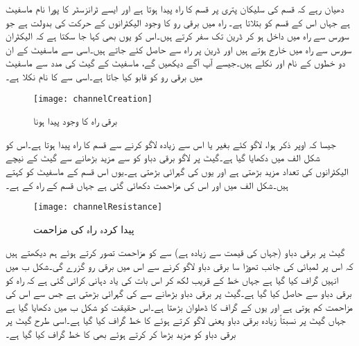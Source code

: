 دھیان رہے کہ  قسم کی سلیکان پتری پر  قسم کا راہ پیدا ہوتا ہے اور ایسے ٹرانزسٹر کا پورا نام    ماسفیٹ  ہے جہاں  اس  کے قسم کو بتلاتا ہے۔ راہ میں برقی رو کا وجود الیکٹرانوں کے حرکت کی بدولت ہے جو سورس سے راہ میں داخل ہو کر ڈرین تک سفر کرتے ہیں۔اس کو یوں بھی کہا جا سکتا ہے کہ الیکٹران سورس سے راہ میں خارج ہوتے ہیں اور ڈرین پر راہ سے حاصل کئے جاتے ہیں۔اسی سے ماسفیٹ کے ان دو خطوں کے نام  اور  نکلے ہیں۔جیسے آپ آگے دیکھیں گے، ماسفیٹ کے گیٹ کی مدد سے ماسفیٹ میں برقی رو کو قابو کیا جاتا ہے۔اسی سے  کا نام نکلا ہے۔
\begin{figure}
\centering
\texttt{[image: channelCreation]}
\caption{برقی راہ کا وجود پیدا ہونا}
\label{شکل_برقی_راہ_کا_وجود_پیدا_ہونا}
\end{figure}
جیسا کہ اوپر ذکر ہوا،  لاگو کئے بغیر  یا اس سے زیادہ  لاگو کرنے  سے  قسم کا راہ پیدا ہوتا ہے۔اس  کو شکل  الف میں دکھایا  گیا ہے۔گیٹ پر لاگو برقی دباو کو  سے مزید بڑھانے سے گیٹ کے نیچے الیکٹرانوں کی تعداد مزید بڑھتی ہے اور یوں  کی گہرائی  بڑھتی ہے۔یوں اس قسم کے ماسفیٹ کو  
  کہتے ہیں۔شکل  الف میں  اور اس کی مزاحمت   دکھائی گئی ہے جہاں  قسم کے راہ کے   ہے۔
\begin{figure}
\centering
\texttt{[image: channelResistance]}
\caption{پیدا کردہ راہ کی مزاحمت}
\label{شکل_پیدا_کردہ_راہ_کی_مزاحمت}
\end{figure}
گیٹ پر   برقی دباو (جہاں  کی قیمت   سے زیادہ ہے) سے  کو مزاحمت  تصور کرتے ہوئے ہم دیکھتے ہیں کہ اس پر لمبائی کی جانب تھوڑا سا برقی دباو  لاگو کرنے سے اس میں برقی رو  گزرے گی۔شکل  ب میں انہیں گراف کیا گیا ہے جہاں خط کے قریب لکھ کر اس بات کی یاد دہانی کرائی گئی ہے کہ راہ کو   برقی دباو سے حاصل کیا گیا ہے۔گیٹ پر برقی دباو  بڑھانے سے  کی گہرائی   بڑھتی ہے جس سے اس کی مزاحمت   کم  ہوتی ہے اور یوں   کے گراف کا ڈھلوان بڑھتا ہے۔اس حقیقت کو شکل  ب میں دکھایا گیا ہے جہاں گیٹ پر نسبتاً زیادہ برقی دباو یعنی  لاگو کرتے ہوئے  کا خط گراف  کیا گیا ہے۔اسی طرح گیٹ پر برقی دباو کو مزید بڑھا کر  کرتے ہوئے بھی   کا خط گراف کیا گیا ہے۔


